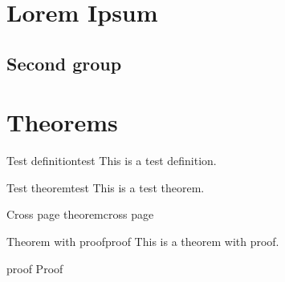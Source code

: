 \documentclass[
    authors={Autore},
    course={Course Name},
    department={mige},
    teachers={Teacher},
    teaching={Teaching Name},
    year={2000/01}
]{unitsnotes}
\begin{document}
    \chapter{Lorem Ipsum}
    \lipsum[1-10]

    \section{Second group}
    \lipsum[10-20]

    \chapter{Theorems}
    \begin{definition}{Test definition}{test}
        This is a test definition.
    \end{definition}
    \begin{theorem}{Test theorem}{test}
        This is a test theorem.
    \end{theorem}
    \vspace{3in}
    \begin{theorem}{Cross page theorem}{cross page}
        \lipsum[1-2]
    \end{theorem}
    \vspace{1in}
    \begin{theorem}{Theorem with proof}{proof}
        This is a theorem with proof.
    \end{theorem}
    \begin{theorem-proof}{proof}
        Proof
    \end{theorem-proof}
\end{document}
